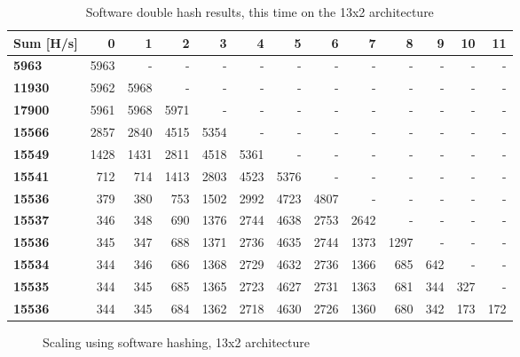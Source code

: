 \begin{appendix}
\begin{table}
\begin{tabular}{| l || r r r r r r r r r r r r |}
  \hline 
  \textbf{Sum} [H/s] & \textbf{0} & \textbf{1} & \textbf{2} & \textbf{3} & \textbf{4} & \textbf{5} & \textbf{6} & \textbf{7} & \textbf{8} & \textbf{9} & \textbf{10} & \textbf{11}\\
  \hline                       
  \textbf{5963} & 5963 & - & - & - & - & - & - & - & - & - & - & - \\
  \textbf{11930} & 5962 & 5968 & - & - & - & - & - & - & - & - & - & - \\
  \textbf{17900} & 5961 & 5968 & 5971 & - & - & - & - & - & - & - & - & - \\
  \textbf{15566} & 2857 & 2840 & 4515 & 5354 & - & - & - & - & - & - & - & - \\
  \textbf{15549} & 1428 & 1431 & 2811 & 4518 & 5361 & - & - & - & - & - & - & - \\
  \textbf{15541} & 712 & 714 & 1413 & 2803 & 4523 & 5376 & - & - & - & - & - & - \\
  \textbf{15536} & 379 & 380 & 753 & 1502 & 2992 & 4723 & 4807 & - & - & - & - & - \\
  \textbf{15537} & 346 & 348 & 690 & 1376 & 2744 & 4638 & 2753 & 2642 & - & - & - & -\\
  \textbf{15536} & 345 & 347 & 688 & 1371 & 2736 & 4635 & 2744 & 1373 & 1297 & - & - & -\\
  \textbf{15534} & 344 & 346 & 686 & 1368 & 2729 & 4632 & 2736 & 1366 & 685 & 642 & - & -\\
  \textbf{15535} & 344 & 345 & 685 & 1365 & 2723 & 4627 & 2731 & 1363 & 681 & 344 & 327 & -\\
  \textbf{15536} & 344 & 345 & 684 & 1362 & 2718 & 4630 & 2726 & 1360 & 680 & 342 & 173 & 172\\
  \hline  
\end{tabular}
\caption{Software double hash results, this time on the 13x2 architecture}
\label{tab:Full-Perf-SW2}
\end{table}


\begin{figure}
	\caption{Scaling using software hashing, 13x2 architecture}
	\label{fig:sw-scaling2}
\end{figure}


\end{appendix}
